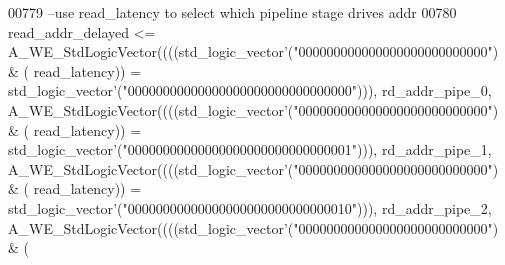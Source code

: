\begin{DoxyCode}
00779 \textcolor{keyword}{  --use read\_latency to select which pipeline stage drives addr}
00780   \textcolor{vhdlchar}{read_addr_delayed} \textcolor{vhdlchar}{<=} \textcolor{vhdlchar}{A\_WE\_StdLogicVector}\textcolor{vhdlchar}{(}\textcolor{vhdlchar}{(}\textcolor{vhdlchar}{(}\textcolor{vhdlchar}{(}\textcolor{comment}{std\_logic\_vector}\textcolor{vhdlchar}{'}\textcolor{vhdlchar}{(}\textcolor{vhdllogic}{"000000000000000000000000000"}\textcolor{vhdlchar}{)} \textcolor{vhdlchar}{&} \textcolor{vhdlchar}{(}\textcolor{vhdlchar}{
      read_latency}\textcolor{vhdlchar}{)}\textcolor{vhdlchar}{)} \textcolor{vhdlchar}{=} \textcolor{comment}{std\_logic\_vector}\textcolor{vhdlchar}{'}\textcolor{vhdlchar}{(}\textcolor{vhdllogic}{"00000000000000000000000000000000"}\textcolor{vhdlchar}{)}\textcolor{vhdlchar}{)}\textcolor{vhdlchar}{)}\textcolor{vhdlchar}{,} \textcolor{vhdlchar}{
      rd_addr_pipe_0}\textcolor{vhdlchar}{,} \textcolor{vhdlchar}{A\_WE\_StdLogicVector}\textcolor{vhdlchar}{(}\textcolor{vhdlchar}{(}\textcolor{vhdlchar}{(}\textcolor{vhdlchar}{(}\textcolor{comment}{std\_logic\_vector}\textcolor{vhdlchar}{'}\textcolor{vhdlchar}{(}\textcolor{vhdllogic}{"000000000000000000000000000"}\textcolor{vhdlchar}{)} \textcolor{vhdlchar}{&} \textcolor{vhdlchar}{(}\textcolor{vhdlchar}{
      read_latency}\textcolor{vhdlchar}{)}\textcolor{vhdlchar}{)} \textcolor{vhdlchar}{=} \textcolor{comment}{std\_logic\_vector}\textcolor{vhdlchar}{'}\textcolor{vhdlchar}{(}\textcolor{vhdllogic}{"00000000000000000000000000000001"}\textcolor{vhdlchar}{)}\textcolor{vhdlchar}{)}\textcolor{vhdlchar}{)}\textcolor{vhdlchar}{,} \textcolor{vhdlchar}{
      rd_addr_pipe_1}\textcolor{vhdlchar}{,} \textcolor{vhdlchar}{A\_WE\_StdLogicVector}\textcolor{vhdlchar}{(}\textcolor{vhdlchar}{(}\textcolor{vhdlchar}{(}\textcolor{vhdlchar}{(}\textcolor{comment}{std\_logic\_vector}\textcolor{vhdlchar}{'}\textcolor{vhdlchar}{(}\textcolor{vhdllogic}{"000000000000000000000000000"}\textcolor{vhdlchar}{)} \textcolor{vhdlchar}{&} \textcolor{vhdlchar}{(}\textcolor{vhdlchar}{
      read_latency}\textcolor{vhdlchar}{)}\textcolor{vhdlchar}{)} \textcolor{vhdlchar}{=} \textcolor{comment}{std\_logic\_vector}\textcolor{vhdlchar}{'}\textcolor{vhdlchar}{(}\textcolor{vhdllogic}{"00000000000000000000000000000010"}\textcolor{vhdlchar}{)}\textcolor{vhdlchar}{)}\textcolor{vhdlchar}{)}\textcolor{vhdlchar}{,} \textcolor{vhdlchar}{
      rd_addr_pipe_2}\textcolor{vhdlchar}{,} \textcolor{vhdlchar}{A\_WE\_StdLogicVector}\textcolor{vhdlchar}{(}\textcolor{vhdlchar}{(}\textcolor{vhdlchar}{(}\textcolor{vhdlchar}{(}\textcolor{comment}{std\_logic\_vector}\textcolor{vhdlchar}{'}\textcolor{vhdlchar}{(}\textcolor{vhdllogic}{"000000000000000000000000000"}\textcolor{vhdlchar}{)} \textcolor{vhdlchar}{&} \textcolor{vhdlchar}{(}\textcolor{vhdlchar}{
}
\end{DoxyCode}
